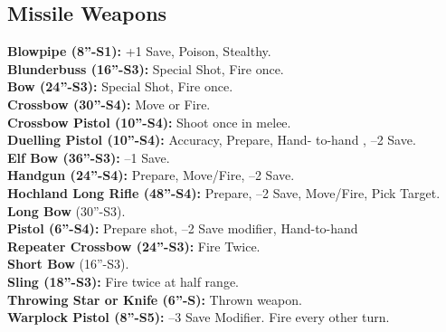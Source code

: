 \subsection*{Missile Weapons}
{\small \textbf{Blowpipe (8”-S1):} +1 Save, Poison, Stealthy. \\
\textbf{Blunderbuss (16”-S3):} Special Shot, Fire once. \\
\textbf{Bow (24”-S3):} Special Shot, Fire once. \\
\textbf{Crossbow (30”-S4):} Move or Fire. \\
\textbf{Crossbow Pistol (10”-S4):} Shoot once in melee. \\
\textbf{Duelling Pistol (10”-S4):} Accuracy, Prepare, Hand- to-hand , –2 Save. \\
\textbf{Elf Bow (36”-S3):} –1 Save. \\
\textbf{Handgun (24”-S4):} Prepare, Move/Fire, –2 Save. \\
\textbf{Hochland Long Rifle (48”-S4):} Prepare, –2 Save, Move/Fire, Pick Target. \\
\textbf{Long Bow} (30”-S3). \\
\textbf{Pistol (6”-S4):} Prepare shot, –2 Save modifier, Hand-to-hand \\
\textbf{Repeater Crossbow (24”-S3):} Fire Twice. \\
\textbf{Short Bow} (16”-S3). \\
\textbf{Sling (18”-S3):} Fire twice at half range. \\
\textbf{Throwing Star or Knife (6”-S):} Thrown weapon. \\
\textbf{Warplock Pistol (8”-S5):} –3 Save Modifier. Fire every other turn.}

